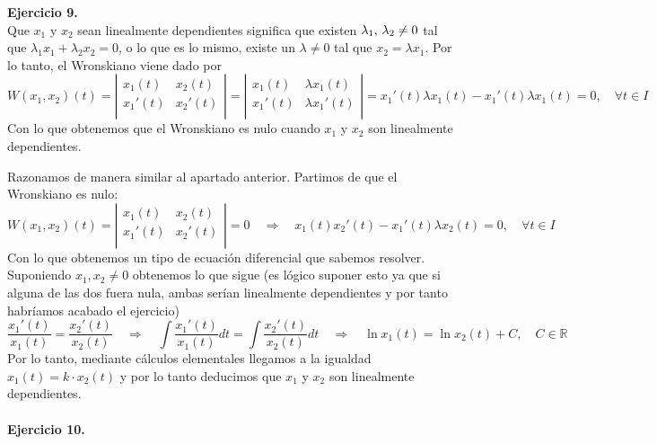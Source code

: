 \documentclass[fleqn]{article}
\def\R{\mathds{R}}
\begin{document}
    \textbf{Ejercicio 9.} \\

    \framebox{$\Rightarrow$}
    Que $x_1$ y $x_2$ sean linealmente dependientes significa que existen $\lambda_1, \thinspace \lambda_2 \neq 0$ tal que $\lambda_1x_1 + \lambda_2x_2 = 0$,
    o lo que es lo mismo, existe un $\lambda \neq 0$ tal que $x_2=\lambda x_1$. Por lo tanto, el Wronskiano viene dado por 
    $$W(x_1,x_2)(t) = \left|
    \begin{matrix}
        x_1(t) & x_2(t) \\
        x_1'(t) & x_2'(t) \\
    \end{matrix}
    \right|= \left|
    \begin{matrix}
        x_1(t) & \lambda x_1(t) \\
        x_1'(t) & \lambda x_1'(t) \\
    \end{matrix}
    \right| = x_1'(t)\lambda x_1(t) - x_1'(t)\lambda x_1(t)=0, \quad \forall t \in I
    $$
Con lo que obtenemos que el Wronskiano es nulo cuando  $x_1$ y $x_2$ son linealmente dependientes.

\framebox{$\Leftarrow$} Razonamos de manera similar al apartado anterior. Partimos de que el Wronskiano es nulo:
$$W(x_1,x_2)(t) = \left|
\begin{matrix}
    x_1(t) & x_2(t) \\
    x_1'(t) & x_2'(t) \\
\end{matrix}
\right|=0 \quad \Rightarrow \quad x_1(t) x_2'(t) - x_1'(t)\lambda x_2(t)=0, \quad \forall t \in I$$
Con lo que obtenemos un tipo de ecuación diferencial que sabemos resolver. Suponiendo $x_1,x_2 \neq 0$ obtenemos lo que sigue
(es lógico suponer esto ya que si alguna de las dos fuera nula, ambas serían linealmente dependientes 
y por tanto habríamos acabado el ejercicio)
$$\frac{x_1'(t)}{x_1(t)}=\frac{x_2'(t)}{x_2(t)} \quad \Rightarrow \quad  \int \frac{x_1'(t)}{x_1(t)} dt=\int \frac{x_2'(t)}{x_2(t)} dt
\quad \Rightarrow \quad \ln x_1(t) = \ln x_2(t) +C, \quad C\in\R$$
Por lo tanto, mediante cálculos elementales llegamos a la igualdad $x_1(t)=k\cdot x_2(t)$ y por lo tanto deducimos que  $x_1$ y $x_2$ son linealmente dependientes.\\ \\

\textbf{Ejercicio 10.} \\
\end{document}
